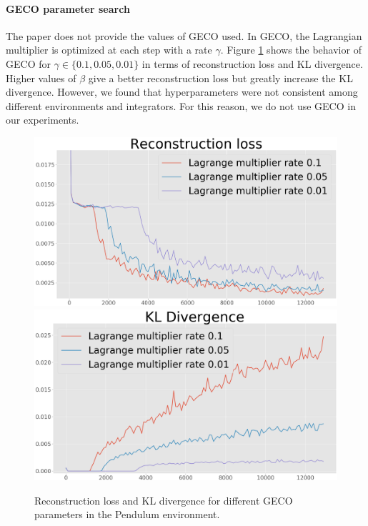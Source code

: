 \paragraph{GECO parameter search} \label{sec:hyperparam_search} The paper does not provide the values of GECO \cite{geco} used. In GECO, the Lagrangian multiplier is optimized at each step with a rate $\gamma$.
Figure \ref{fig:geco_search} shows the behavior of GECO for $\gamma \in \{0.1, 0.05, 0.01\}$ in terms of reconstruction loss and KL divergence. Higher values of $\beta$ give a better reconstruction loss but greatly increase the KL divergence. %
However, we found that hyperparameters were not consistent among different environments and integrators. For this reason, we do not use GECO in our experiments.
\begin{figure}[]
\centering
  \includegraphics[width=0.8\linewidth]{../openreview/pictures/parameter_comparisons/lagrange_multiplier_comparison_rec_loss.png}
\endminipage\hfill
{}
\centering
  \includegraphics[width=0.8\linewidth]{../openreview/pictures/parameter_comparisons/lagrange_multiplier_comparison_kld.png}
\endminipage
\caption{Reconstruction loss and KL divergence for different GECO parameters in the Pendulum environment.}
\label{fig:geco_search}
\end{figure}


